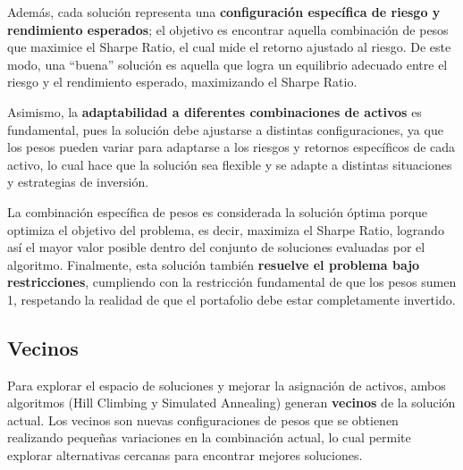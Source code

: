\documentclass[9pt,a4paper,twoside]{rho-class/rho}
\begin{document}
            Además, cada solución representa una \textbf{configuración específica de riesgo y rendimiento esperados}; el objetivo es encontrar aquella combinación de pesos que maximice el Sharpe Ratio, el cual mide el retorno ajustado al riesgo. De este modo, una ``buena'' solución es aquella que logra un equilibrio adecuado entre el riesgo y el rendimiento esperado, maximizando el Sharpe Ratio.

            Asimismo, la \textbf{adaptabilidad a diferentes combinaciones de activos} es fundamental, pues la solución debe ajustarse a distintas configuraciones, ya que los pesos pueden variar para adaptarse a los riesgos y retornos específicos de cada activo, lo cual hace que la solución sea flexible y se adapte a distintas situaciones y estrategias de inversión.


La combinación específica de pesos es considerada la solución óptima porque optimiza el objetivo del problema, es decir, maximiza el Sharpe Ratio, logrando así el mayor valor posible dentro del conjunto de soluciones evaluadas por el algoritmo. Finalmente, esta solución también \textbf{resuelve el problema bajo restricciones}, cumpliendo con la restricción fundamental de que los pesos sumen 1, respetando la realidad de que el portafolio debe estar completamente invertido.
        \subsection{Vecinos}
            Para explorar el espacio de soluciones y mejorar la asignación de activos, ambos algoritmos (Hill Climbing y Simulated Annealing) generan \textbf{vecinos} de la solución actual. Los vecinos son nuevas configuraciones de pesos que se obtienen realizando pequeñas variaciones en la combinación actual, lo cual permite explorar alternativas cercanas para encontrar mejores soluciones.
\end{document}
